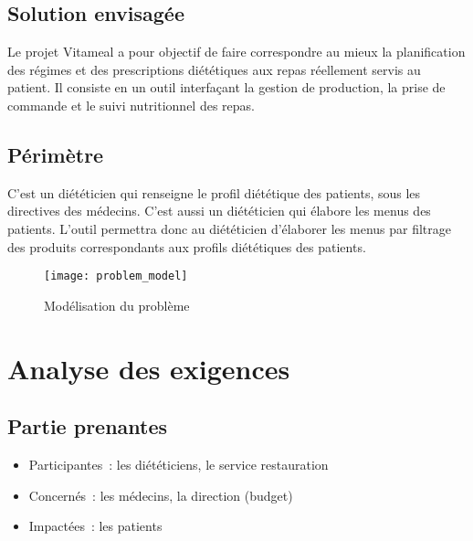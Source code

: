 \subsection{Solution envisagée}
Le projet Vitameal a pour objectif de faire correspondre au mieux la planification des régimes et des
prescriptions diététiques aux repas réellement servis au patient. Il consiste en un outil interfaçant la
gestion de production, la prise de commande et le suivi nutritionnel des repas.

\subsection{Périmètre}
C'est un diététicien qui renseigne le profil diététique des patients,
sous les directives des médecins. C'est aussi un diététicien qui élabore
les menus des patients. L'outil permettra donc au diététicien d'élaborer
les menus par filtrage des produits correspondants aux profils
diététiques des patients.
\begin{figure}[H]
\label{Modelisation_du _probleme}
  \centering
      \texttt{[image: problem\_model]} %
\caption{Modélisation du  problème}
\end{figure}

\section{Analyse des exigences}
\subsection{Partie prenantes}
\begin{itemize}
\item Participantes~: les diététiciens, le service restauration
\item Concernés~: les médecins, la direction (budget)
\item Impactées~: les patients
\end{itemize}

